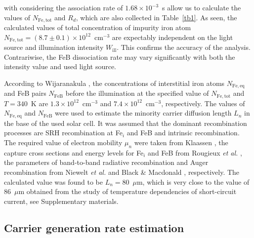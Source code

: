 \documentclass{WileyMSP-template}
\begin{document}

with considering the association rate of $1.68\times10^{-3}$~s allow us
to calculate the values of $N_\mathrm{Fe,tot}$ and $R_d$, which are also collected in Table~\ref{tb1}.
As seen, the calculated values of total concentration of impurity iron atom
$N_\mathrm{Fe,tot}=(8.7\pm0.1)\times10^{12}$~cm$^{-3}$ are expectably independent on the light source and illumination intensity $W_\mathrm{ill}$.
This confirms the accuracy of the analysis.
Contrariwise, the FeB dissociation rate may vary significantly with both the intensity value and used light source.

According to Wijaranakula \cite{FeB:kinetic}, the concentrations of interstitial iron atoms $N_\mathrm{Fe,eq}$ and FeB pairs
$N_\mathrm{FeB}$ before the illumination at the specified value of $N_\mathrm{Fe,tot}$ and $T=340$~K are $1.3\times10^{12}$~cm$^{-3}$ and $7.4\times10^{12}$~cm$^{-3}$, respectively.
The values of $N_\mathrm{Fe,eq}$ and $N_\mathrm{FeB}$ were used to estimate the minority carrier diffusion length $L_n$
in the base of the used solar cell.
It was assumed that the dominant recombination processes are SRH recombination at Fe$_i$ and FeB and intrinsic recombination.
The required value of electron mobility $\mu_n$ were taken from Klaassen \cite{KLAASSEN953},
the capture cross sections and energy levels for Fe$_i$ and FeB from Rougieux \emph{et al.} \cite{ROUGIEUX2018},
the parameters of band-to-band radiative recombination and Auger recombination from
Niewelt \emph{et al.} \cite{Brad2022} and Black \& Macdonald \cite{AugerSi2022}, respectively.
The calculated value was found to be $L_n=80$~$\mu$m,
which is very close to the value of 86~$\mu$m  obtained from the study of temperature dependencies of short-circuit current, see Supplementary materials.


\subsection{Carrier generation rate estimation}\label{SecG}
\end{document}
